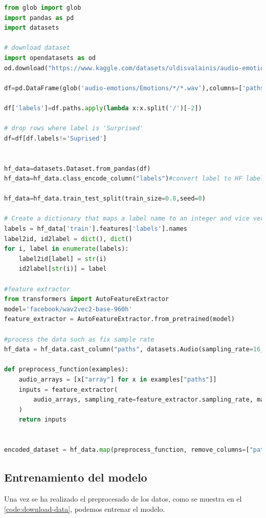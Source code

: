 \begin{lstlisting}[language=Python, caption=Preprocesado del dataset, label={code:download-data}]
from glob import glob
import pandas as pd
import datasets

# download dataset
import opendatasets as od
od.download("https://www.kaggle.com/datasets/uldisvalainis/audio-emotions")

df=pd.DataFrame(glob('audio-emotions/Emotions/*/*.wav'),columns=['paths'])

df['labels']=df.paths.apply(lambda x:x.split('/')[-2])

# drop rows where label is 'Surprised'
df=df[df.labels!='Suprised']


hf_data=datasets.Dataset.from_pandas(df)
hf_data=hf_data.class_encode_column("labels")#convert label to HF label class

hf_data=hf_data.train_test_split(train_size=0.8,seed=0)

# Create a dictionary that maps a label name to an integer and vice versa. The mapping will help the model recover the label name from the label number:
labels = hf_data['train'].features['labels'].names
label2id, id2label = dict(), dict()
for i, label in enumerate(labels):
    label2id[label] = str(i)
    id2label[str(i)] = label

#feature extractor
from transformers import AutoFeatureExtractor
model='facebook/wav2vec2-base-960h'
feature_extractor = AutoFeatureExtractor.from_pretrained(model)

#process the data such as fix sample rate
hf_data = hf_data.cast_column("paths", datasets.Audio(sampling_rate=16_000))

def preprocess_function(examples):
    audio_arrays = [x["array"] for x in examples["paths"]]
    inputs = feature_extractor(
        audio_arrays, sampling_rate=feature_extractor.sampling_rate, max_length=16000*2, truncation=True
    )
    return inputs


encoded_dataset = hf_data.map(preprocess_function, remove_columns=["paths"], batched=True)


\end{lstlisting}



\subsection{Entrenamiento del modelo}\label{seccion:entrenamiento-del-modelo}
Una vez se ha realizado el preprocesado de los datos, como se muestra en el \autoref{code:download-data}, podemos entrenar el modelo.

